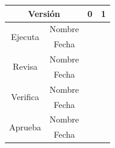 \documentclass[12pt]{article}
\begin{document}
\begin{table}[h]
\centering
\begin{tabular}{|cc|c|c|}
\hline
\multicolumn{2}{|c|}{Versión}                            & 0 & 1 \\ \hline
\multicolumn{1}{|c|}{\multirow{2}{*}{Ejecuta}}  & Nombre &   &   \\ \cline{2-4}
\multicolumn{1}{|c|}{}                          & Fecha  &   &   \\ \hline
\multicolumn{1}{|c|}{\multirow{2}{*}{Revisa}}   & Nombre &   &   \\ \cline{2-4}
\multicolumn{1}{|c|}{}                          & Fecha  &   &   \\ \hline
\multicolumn{1}{|c|}{\multirow{2}{*}{Verifica}} & Nombre &   &   \\ \cline{2-4}
\multicolumn{1}{|c|}{}                          & Fecha  &   &   \\ \hline
\multicolumn{1}{|c|}{\multirow{2}{*}{Aprueba}}  & Nombre &   &   \\ \cline{2-4}
\multicolumn{1}{|c|}{}                          & Fecha  &   &   \\ \hline
\end{tabular}
\end{table}

\newpage
\vspace*{0.1cm}
\renewcommand\contentsname{Tabla de contenido}
\tableofcontents
\newpage
\vspace*{0.1cm}
\renewcommand{\listfigurename}{Lista de figuras}
\listoffigures
\newpage
\vspace*{0.1cm}
\renewcommand{\listtablename}{Lista de tablas}
\listoftables
\newpage
\vspace*{0.1cm}


\end{document}
